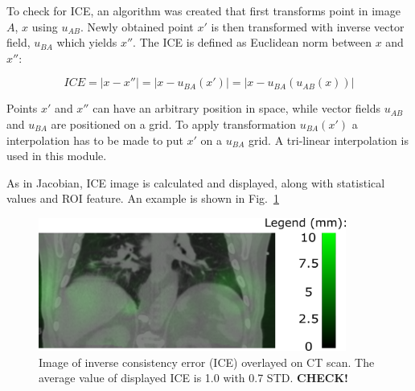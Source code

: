 \documentclass[type=dr, dr=rernat, accentcolor=tud7b,colorbacktitle, bigchapter, openright, twoside, 12pt ]{tudthesis}
\begin{document}
To check for ICE, an algorithm was created that first transforms point in image $A$, $x$ using $u_{AB}$. Newly obtained point $x'$ is then transformed with inverse vector
field, $u_{BA}$ which yields $x''$. The ICE is defined as Euclidean norm between $x$ and $x''$:

\begin{equation}
\label{eq:ice}
ICE = |x - x''| = |x - u_{BA}(x')| = |x - u_{BA}(u_{AB}(x))|
\end{equation}

Points $x'$ and $x''$ can have an arbitrary position in space, while vector fields $u_{AB}$ and $u_{BA}$ are positioned on a grid. To apply transformation $u_{BA}(x')$ a interpolation has to be made to put $x'$ on a $u_{BA}$ grid. A tri-linear interpolation is used in this module.

As in Jacobian, ICE image is calculated and displayed, along with statistical values and ROI feature. An example is shown in Fig.~\ref{inv}

\begin{figure}[H]
\begin{center}
\includegraphics[width=0.9\textwidth]{./Images/inv.png}
\caption{Image of inverse consistency error (ICE) overlayed on CT scan. The average value of displayed ICE is 1.0 with 0.7 STD. \textbf{CHECK!}}
\label{inv}
\end{center}
\end{figure}


% 
\end{document}
